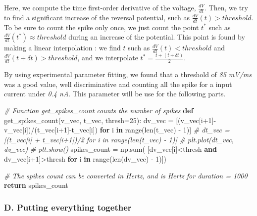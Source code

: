 \documentclass[]{article}
\newenvironment{Shaded}{}{}
\newcommand{\BuiltInTok}[1]{#1}
\newcommand{\CommentTok}[1]{\textcolor[rgb]{0.38,0.63,0.69}{\textit{#1}}}
\newcommand{\ControlFlowTok}[1]{\textcolor[rgb]{0.00,0.44,0.13}{\textbf{#1}}}
\newcommand{\DecValTok}[1]{\textcolor[rgb]{0.25,0.63,0.44}{#1}}
\newcommand{\KeywordTok}[1]{\textcolor[rgb]{0.00,0.44,0.13}{\textbf{#1}}}
\newcommand{\NormalTok}[1]{#1}
\newcommand{\OperatorTok}[1]{\textcolor[rgb]{0.40,0.40,0.40}{#1}}
\begin{document}
Here, we compute the time first-order derivative of the voltage,
\(\frac{dV}{dt}\). Then, we try to find a significant increase of the
reversal potential, such as \(\frac{dV}{dt}(t) > threshold\). To be sure
to count the spike only once, we just count the point \(t^*\) such as
\(\frac{dV}{dt}(t^*) \approx threshold\) during an increase of the
potential. This point is found by making a linear interpolation : we
find \(t\) such as \(\frac{dV}{dt}(t) < threshold\) and
\(\frac{dV}{dt}(t + \delta t) > threshold\), and we interpolate
\(t^* = \frac{t + (t+\delta t)}{2}\).

By using experimental parameter fitting, we found that a threshold of
\emph{85 mV/ms} was a good value, well discriminative and counting all
the spike for a input current under \emph{0.4 nA}. This parameter will
be use for the following parts.

\begin{Shaded}
\begin{Highlighting}[]
\CommentTok{# Function get_spikes_count counts the number of spikes }
\KeywordTok{def}\NormalTok{ get_spikes_count(v_vec, t_vec, thresh}\OperatorTok{=}\DecValTok{25}\NormalTok{): }
\NormalTok{    dv_vec }\OperatorTok{=}\NormalTok{ [(v_vec[i}\OperatorTok{+}\DecValTok{1}\NormalTok{]}\OperatorTok{-}\NormalTok{v_vec[i])}\OperatorTok{/}\NormalTok{(t_vec[i}\OperatorTok{+}\DecValTok{1}\NormalTok{]}\OperatorTok{-}\NormalTok{t_vec[i]) }\ControlFlowTok{for}\NormalTok{ i }\KeywordTok{in} \BuiltInTok{range}\NormalTok{(}\BuiltInTok{len}\NormalTok{(t_vec) }\OperatorTok{-} \DecValTok{1}\NormalTok{)]}
    \CommentTok{# dt_vec = [(t_vec[i] + t_vec[i+1])/2 for i in range(len(t_vec) - 1)]}
    \CommentTok{# plt.plot(dt_vec, dv_vec)}
    \CommentTok{# plt.show()}
\NormalTok{    spikes_count }\OperatorTok{=}\NormalTok{ np.}\BuiltInTok{sum}\NormalTok{(}
\NormalTok{        [dv_vec[i]}\OperatorTok{<}\NormalTok{thresh }\KeywordTok{and}\NormalTok{ dv_vec[i}\OperatorTok{+}\DecValTok{1}\NormalTok{]}\OperatorTok{>}\NormalTok{thresh }\ControlFlowTok{for}\NormalTok{ i }\KeywordTok{in} \BuiltInTok{range}\NormalTok{(}\BuiltInTok{len}\NormalTok{(dv_vec) }\OperatorTok{-} \DecValTok{1}\NormalTok{)])}
    
    \CommentTok{# The spikes count can be converted in Hertz, and is Hertz for duration = 1000}
    \ControlFlowTok{return}\NormalTok{ spikes_count}
\end{Highlighting}
\end{Shaded}

\hypertarget{d.-putting-everything-together}{%
\subsubsection{D. Putting everything
together}\label{d.-putting-everything-together}}
\end{document}
